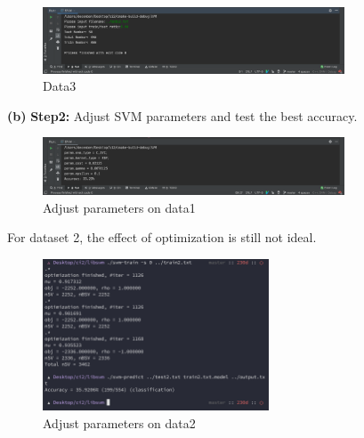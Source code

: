\documentclass[11pt]{article}
\renewcommand\part[1]{\vspace{.10in}\textbf{(#1)}}
\newcommand\two{\vspace{.10in}\textbf{Step2: }}
\begin{document}
\begin{figure}[H]
    \centering
    \includegraphics[width=0.8\textwidth]{gd3}
    \caption{Data3}
\end{figure}

\part{b} \two Adjust SVM parameters and test the best accuracy. \\

\begin{figure}[H]
    \centering
    \includegraphics[width=0.8\textwidth]{d1p1}
    \caption{Adjust parameters on data1}
\end{figure}

For dataset 2, the effect of optimization is still not ideal.\\

\begin{figure}[H]
    \centering
    \includegraphics[width=0.6\textwidth]{d2p1}
    \caption{Adjust parameters on data2}
\end{figure}
\end{document}
